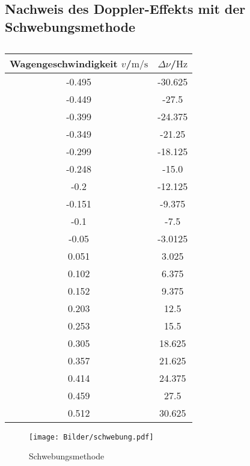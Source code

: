 \subsection{Nachweis des Doppler-Effekts mit der Schwebungsmethode}
\begin{table}
	\centering
	\caption{}
	\label{tab:direkt}
	\begin{tabular}{cc}
		\toprule
		Wagengeschwindigkeit $v$/$\si{\meter\per\second}$ & $\Delta \nu$/$\si{\Hz}$ \\
		\midrule
		-0.495                                            & -30.625                 \\
		-0.449                                            & -27.5                   \\
		-0.399                                            & -24.375                 \\
		-0.349                                            & -21.25                  \\
		-0.299                                            & -18.125                 \\
		-0.248                                            & -15.0                   \\
		-0.2                                              & -12.125                 \\
		-0.151                                            & -9.375                  \\
		-0.1                                              & -7.5                    \\
		-0.05                                             & -3.0125                 \\
		0.051                                             & 3.025                   \\
		0.102                                             & 6.375                   \\
		0.152                                             & 9.375                   \\
		0.203                                             & 12.5                    \\
		0.253                                             & 15.5                    \\
		0.305                                             & 18.625                  \\
		0.357                                             & 21.625                  \\
		0.414                                             & 24.375                  \\
		0.459                                             & 27.5                    \\
		0.512                                             & 30.625                  \\
		\bottomrule
	\end{tabular}
\end{table}
\begin{figure}
	\texttt{[image: Bilder/schwebung.pdf]}
	\caption{Schwebungsmethode}
	\label{fig:doppler_schwebung}
\end{figure}
